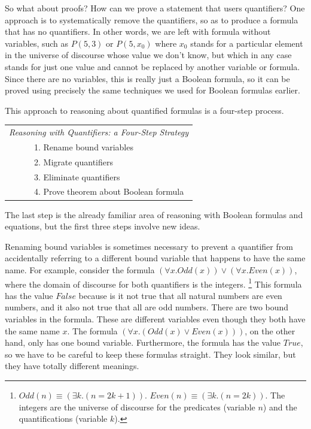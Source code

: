{So what about proofs? How can we prove a statement that users quantifiers?
One approach is to systematically
remove the quantifiers, so as to produce a formula that has no quantifiers.
In other words, we
are left with formula without variables, such as $P(5,3)$ or $P(5,x_0)$ where
$x_0$ stands for a particular element in the universe of discourse whose value
we don't know, but which in any case stands for just one value and cannot
be replaced by another variable or formula.
Since there are no variables, this is really just a Boolean formula,
so it can be proved using precisely the same techniques we used for Boolean
formulas earlier.

This approach to reasoning about quantified formulas is a four-step process.

\begin{center}
\begin{tabular} {l}
\emph{Reasoning with Quantifiers: a Four-Step Strategy} \\
~~~~~~1. Rename bound variables \\
~~~~~~2. Migrate quantifiers \\
~~~~~~3. Eliminate quantifiers \\
~~~~~~4. Prove theorem about Boolean formula \\
\end{tabular}
\label{four-step-strategy-quantifiers}
\end{center}

The last step is the already familiar area of reasoning
with Boolean formulas and equations,
but the first three steps involve new ideas.

Renaming bound variables is sometimes necessary to prevent
a quantifier from accidentally referring to a different bound variable
that happens to have the same name.
For example, consider the formula
$(\forall x.Odd(x)) \vee (\forall x.Even(x))$,
where the domain of discourse for both quantifiers is the integers.
\footnote{$Odd(n) \equiv (\exists k.(n = 2k+1))$.
\label{even-number-predicate-Even}
$Even(n) \equiv (\exists k.(n = 2k))$.
The integers are the universe of discourse for the predicates (variable $n$)
and the quantifications (variable $k$).}
This formula has the value $False$ because is it not true
that all natural numbers are even numbers,
and it also not true that all are odd numbers.
There are two bound variables in the formula.
These are different variables even though they both have
the same name $x$.
The formula $(\forall x.(Odd(x) \vee Even(x)))$, on the other hand,
only has one bound variable.
Furthermore, the formula has the value $True$,
so we have to be careful to keep these formulas straight.
They look similar, but they have totally different meanings.

}
